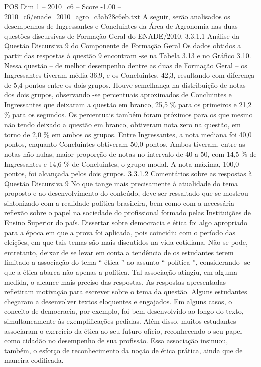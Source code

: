 \begin{textsample}{POS Dim 1 – 2010\_c6 – Score -1.00 – 2010\_c6/enade\_2010\_agro\_c3ab28c6eb.txt}
A seguir, serão analisados os desempenhos de Ingressantes e Concluintes da Área de Agronomia nas duas questões discursivas de Formação Geral do ENADE/2010. 3.3.1.1 Análise da Questão Discursiva 9 do Componente de Formação Geral Os dados obtidos a partir das respostas à questão 9 encontram -se na Tabela 3.13 e no Gráfico 3.10.
Nessa questão – de melhor desempenho dentre as duas de Formação Geral – os Ingressantes tiveram média 36,9, e os Concluintes, 42,3, resultando com diferença de 5,4 pontos entre os dois grupos.
Houve semelhança na distribuição de notas dos dois grupos, observando -se percentuais aproximados de Concluintes e Ingressantes que deixaram a questão em branco, 25,5 \% para os primeiros e 21,2 \% para os segundos.
Os percentuais também foram próximos para os que mesmo não tendo deixado a questão em branco, obtiveram nota zero na questão, em torno de 2,0 \% em ambos os grupos.
Entre Ingressantes, a nota mediana foi 40,0 pontos, enquanto Concluintes obtiveram 50,0 pontos.
Ambos tiveram, entre as notas não nulas, maior proporção de notas no intervalo de 40 a 50, com 14,5 \% de Ingressantes e 14,6 \% de Concluintes, o grupo modal.
A nota máxima, 100,0 pontos, foi alcançada pelos dois grupos. 3.3.1.2 Comentários sobre as respostas à Questão Discursiva 9 No que tange mais precisamente à atualidade do tema proposto e ao desenvolvimento do conteúdo, deve ser ressaltado que se mostrou sintonizado com a realidade política brasileira, bem como com a necessária reflexão sobre o papel na sociedade do profissional formado pelas Instituições de Ensino Superior do país.
Dissertar sobre democracia e ética foi algo apropriado para a época em que a prova foi aplicada, pois coincidiu com o período das eleições, em que tais temas são mais discutidos na vida cotidiana.
Não se pode, entretanto, deixar de se levar em conta a tendência de os estudantes terem limitado a associação do tema “ ética ” ao assunto “ política ”, considerando -se que a ética abarca não apenas a política.
Tal associação atingiu, em alguma medida, o alcance mais preciso das respostas.
As respostas apresentadas refletiram motivação para escrever sobre o tema da questão.
Alguns estudantes chegaram a desenvolver textos eloquentes e engajados.
Em alguns casos, o conceito de democracia, por exemplo, foi bem desenvolvido ao longo do texto, simultaneamente às exemplificações pedidas.
Além disso, muitos estudantes associaram o exercício da ética ao seu futuro ofício, reconhecendo o seu papel como cidadão no desempenho de sua profissão.
Essa associação insinuou, também, o esforço de reconhecimento da noção de ética prática, ainda que de maneira codificada.

\end{textsample}
